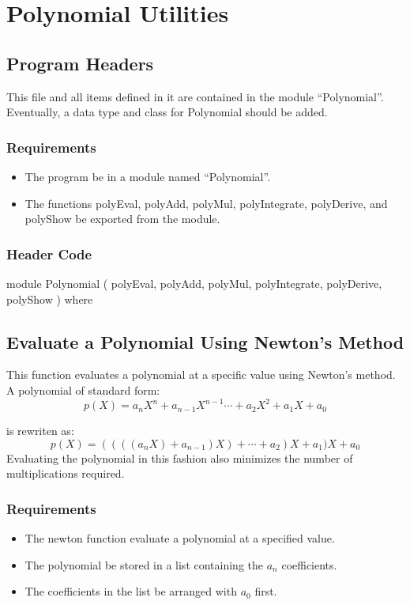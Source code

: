 \chapter{Polynomial Utilities}
\section{Program Headers}
This file and all items defined in it are contained in the module ``Polynomial''.  Eventually, a data type and class for Polynomial should be added.

\subsection{Requirements}
\begin{itemize}
\item The program  be in a module named ``Polynomial''.
\item The functions polyEval, polyAdd, polyMul, polyIntegrate, polyDerive, and polyShow  be exported from the module.
\end{itemize}

\subsection{Header Code}
\begin{code}
module Polynomial ( polyEval, polyAdd, polyMul, polyIntegrate, polyDerive, polyShow ) where
\end{code}

\section{Evaluate a Polynomial Using Newton's Method}
This function evaluates a polynomial at a specific value using Newton's method.  A polynomial of standard form:
\[
p(X) = a_nX^n + a_{n-1}X^{n-1} \cdots + a_2X^2 + a_1X + a_0
\]

is rewriten as:
\[
p(X) = ((((a_nX) + a_{n-1})X) + \cdots + a_2)X + a_1)X + a_0
\]
Evaluating the polynomial in this fashion also minimizes the number of multiplications required.

\subsection{Requirements}
\begin{itemize}
\item The newton function  evaluate a polynomial at a specified value.
\item The polynomial  be stored in a list containing the $a_n$ coefficients.
\item The coefficients in the list  be arranged with $a_0$ first.
\end{itemize}

